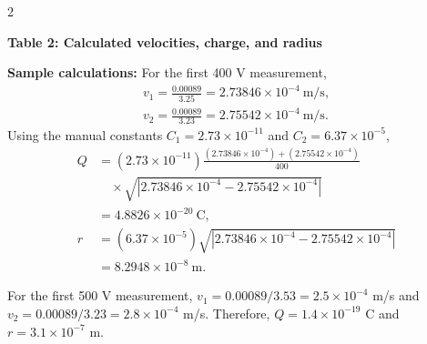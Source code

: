 \documentclass[a4paper,10pt]{report}
\begin{document}
\begin{multicols}{2}
\vspace{10pt}
\begin{center}
\textbf{Table 2: Calculated velocities, charge, and radius} \\
\vspace{5pt}
\renewcommand{\arraystretch}{1.2}
\end{center}

\noindent\textbf{Sample calculations:} For the first 400 V measurement,
\begin{gather*}
v_1=\frac{0.00089}{3.25}=2.73846\times10^{-4}\ \mathrm{m/s},\\
v_2=\frac{0.00089}{3.23}=2.75542\times10^{-4}\ \mathrm{m/s}.
\end{gather*}
Using the manual constants $C_1=2.73\times10^{-11}$ and
$C_2=6.37\times10^{-5}$,
\begin{align*}
Q &= (2.73\times10^{-11})
\frac{(2.73846\times10^{-4})+(2.75542\times10^{-4})}{400}\\
&\quad\times\sqrt{|2.73846\times10^{-4}-2.75542\times10^{-4}|}\\
&=4.8826\times10^{-20}\ \mathrm{C},\\
r &= (6.37\times10^{-5})
\sqrt{|2.73846\times10^{-4}-2.75542\times10^{-4}|}\\
&=8.2948\times10^{-8}\ \mathrm{m}.
\end{align*}

For the first 500 V measurement, $v_1=0.00089/3.53=2.5\times10^{-4}$ m/s
and $v_2=0.00089/3.23=2.8\times10^{-4}$ m/s. Therefore,
$Q=1.4\times10^{-19}$ C and $r=3.1\times10^{-7}$ m.


\end{multicols}
\end{document}
